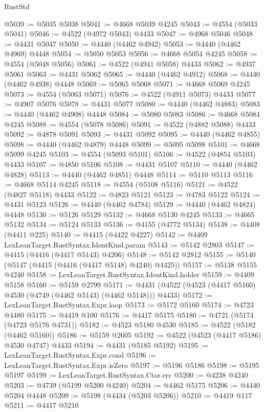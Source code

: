 \begin{lexlean}{RustStd}
\begin{coremodule}
{\begin{coremodule}
{{{{{{{{{{{{{{{{{{{{{{{{{{{{{{{{{{{{{{{{{{{{{{{{{{{{{{{{{{{{@5039 := @5035 @5038
@5041 := @4668 @5039 @4245
@5043 := @4554 (@5033 @5041)
@5046 := @4522 (@4972 @5043) @4433
@5047 := @4968 @5046
@5048 := @4431 @5047
@5050 := @4440 (@4462 @4942)
@5053 := @4440 (@4462 @4969) @4448
@5054 := @5050 @5053
@5056 := @4668 @5054 @4245
@5058 := @4554 (@5048 @5056)
@5061 := @4522 (@4941 @5058) @4433
@5062 := @4937 @5061
@5063 := @4431 @5062
@5065 := @4440 (@4462 @4912)
@5068 := @4440 (@4462 @4938) @4448
@5069 := @5065 @5068
@5071 := @4668 @5069 @4245
@5073 := @4554 (@5063 @5071)
@5076 := @4522 (@4911 @5073) @4433
@5077 := @4907 @5076
@5078 := @4431 @5077
@5080 := @4440 (@4462 @4883)
@5083 := @4440 (@4462 @4908) @4448
@5084 := @5080 @5083
@5086 := @4668 @5084 @4245
@5088 := @4554 (@5078 @5086)
@5091 := @4522 (@4882 @5088) @4433
@5092 := @4878 @5091
@5093 := @4431 @5092
@5095 := @4440 (@4462 @4855)
@5098 := @4440 (@4462 @4879) @4448
@5099 := @5095 @5098
@5101 := @4668 @5099 @4245
@5103 := @4554 (@5093 @5101)
@5106 := @4522 (@4854 @5103) @4433
@5107 := @4850 @5106
@5108 := @4431 @5107
@5110 := @4440 (@4462 @4828)
@5113 := @4440 (@4462 @4851) @4448
@5114 := @5110 @5113
@5116 := @4668 @5114 @4245
@5118 := @4554 (@5108 @5116)
@5121 := @4522 (@4827 @5118) @4433
@5122 := @4823 @5121
@5123 := @4783 @5122
@5124 := @4431 @5123
@5126 := @4440 (@4462 @4784)
@5129 := @4440 (@4462 @4824) @4448
@5130 := @5126 @5129
@5132 := @4668 @5130 @4245
@5133 := @4665 @5132
@5134 := @5124 @5133
@5136 := @4155 (@4772 @5134)
@5138 := @4408 (@4411 @225)
@5140 := @4415 (@4422 @4227)
@5142 := @4409 LexLeanTarget.RustSyntax.IdentKind.param
@5143 := @5142 @2803
@5147 := @4415 (@4416 (@4417 @5143) @4206)
@5148 := @5142 @2812
@5155 := @5140 (@5147 (@4415 (@4416 (@4417 @5148) @4240) @4425))
@5157 := @5138 @5155 @4240
@5158 := LexLeanTarget.RustSyntax.IdentKind.holder
@5159 := @4409 @5158
@5160 := @5159 @2799
@5171 := @4431 (@4522 (@4523 (@4417 @5160) @4530 (@4749 (@4462 @5143) (@4462 @5148))) @4433)
@5172 := LexLeanTarget.RustSyntax.Expr.loop
@5173 := @5172 @5160
@5174 := @4723 @4480
@5175 := @4419 @100
@5176 := @4417 @5175
@5180 := @4721 (@5174 (@4723 @5176 @4731))
@5182 := @4523 @5180 @4530
@5185 := @4522 (@5182 (@4462 @5160))
@5186 := @5159 @2605
@5192 := @4522 (@4523 (@4417 @5186) @4530 @4747) @4433
@5194 := @4431 (@5185 @5192)
@5195 := LexLeanTarget.RustSyntax.Expr.cond
@5196 := LexLeanTarget.RustSyntax.Expr.isZero
@5197 := @5196 @5186
@5198 := @5195 @5197
@5199 := LexLeanTarget.RustSyntax.Ctor.err
@5200 := @4238 @4240
@5203 := @4739 (@5199 @5200 @4240)
@5204 := @4462 @5175
@5206 := @4440 @5204 @4448
@5209 := @5198 (@4434 (@5203 @5206))
@5210 := @4419 @117
@5211 := @4417 @5210
}}}}}}}}}}}}}}}}}}}}}}}}}}}}}}}}}}}}}}}}}}}}}}}}}}}}}}}}}}}}
\end{coremodule}}
\end{coremodule}
\end{lexlean}
